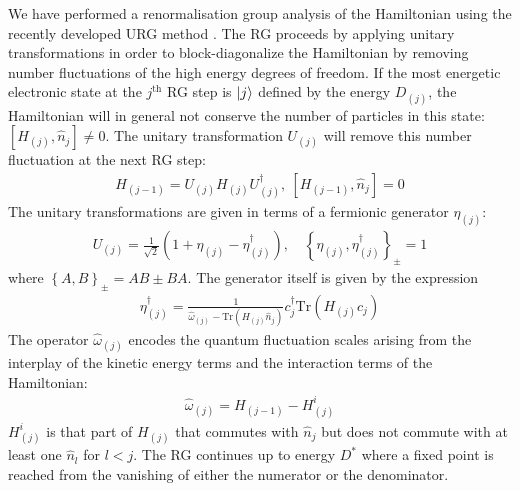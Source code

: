 \documentclass[reprint,prb,superscriptaddress]{revtex4-2}
\begin{document}
We have performed a renormalisation group analysis of the Hamiltonian using the recently developed URG method \cite{anirbanmott1,anirbanmott2,anirbanurg1,anirbanurg2,siddharthacpi,santanukagome,1dhubjhep}. The RG proceeds {by applying unitary transformations in order to block-diagonalize the Hamiltonian by removing number fluctuations of the high energy degrees of freedom}. If the most energetic electronic state at the \(j^\text{th}\) RG step is \(\ket{j}\) defined by the energy \(D_{(j)}\), the Hamiltonian will in general not conserve the number of particles in this state: \(\left[H_{(j)}, \hat n_{j}\right] \neq 0\). The unitary transformation \(U_{(j)}\) will remove this number fluctuation at the next RG step:
\begin{equation}\begin{aligned}
	H_{(j-1)} = U_{(j)} H_{(j)} U^\dagger_{(j)}, ~\left[H_{(j-1)}, \hat n_{j}\right] =0
\end{aligned}\end{equation}
The unitary transformations are given in terms of a fermionic generator \(\eta_{(j)}\):
\begin{equation}\begin{aligned}
	U_{(j)} = \frac{1}{\sqrt 2}\left(1 + \eta_{(j)} - \eta_{(j)}^\dagger\right), \quad\left\{ \eta_{(j)},\eta_{(j)}^\dagger \right\}_\pm = 1
\end{aligned}\end{equation}
where \(\left\{A,B\right\}_\pm = AB \pm BA\). The generator itself is given by the expression
\begin{equation}\begin{aligned}
	\eta^\dagger_{(j)} = \frac{1}{\hat \omega_{(j)} - \text{Tr}\left(H_{(j)} \hat n_{j}\right) } c^\dagger_{j} \text{Tr}\left(H_{(j)}c_{j}\right)
\end{aligned}\end{equation}
The operator \(\hat \omega_{(j)}\) encodes the quantum fluctuation scales arising from the interplay of the kinetic energy terms and the interaction terms of the Hamiltonian:
\begin{equation}\begin{aligned}
	\hat \omega_{(j)} = H_{(j-1)} - H^i_{(j)}
\end{aligned}\end{equation}
\(H^i_{(j)}\) is that part of \(H_{(j)}\) that commutes with \(\hat n_j\) but does not commute with at least one \(\hat n_l\) for \(l < j\). The RG continues up to energy \(D^*\) where a fixed point is reached from the vanishing of either the numerator or the denominator.
\end{document}

